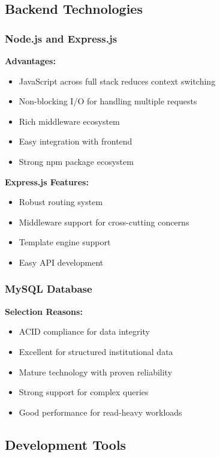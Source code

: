 \documentclass[12pt,a4paper]{report}
\begin{document}
\subsection*{Backend Technologies}

\subsubsection*{Node.js and Express.js}
\textbf{Advantages:}
\begin{itemize}
    \item JavaScript across full stack reduces context switching
    \item Non-blocking I/O for handling multiple requests
    \item Rich middleware ecosystem
    \item Easy integration with frontend
    \item Strong npm package ecosystem
\end{itemize}

\item\textbf{Express.js Features:}
\begin{itemize}
    \item Robust routing system
    \item Middleware support for cross-cutting concerns
    \item Template engine support
    \item Easy API development
\end{itemize}

\subsubsection*{MySQL Database}
\textbf{Selection Reasons:}
\begin{itemize}
    \item ACID compliance for data integrity
    \item Excellent for structured institutional data
    \item Mature technology with proven reliability
    \item Strong support for complex queries
    \item Good performance for read-heavy workloads
\end{itemize}

\subsection*{Development Tools}
\end{document}
